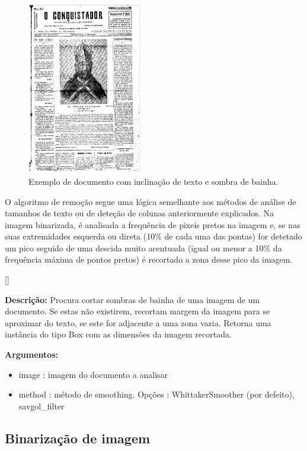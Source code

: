 \begin{figure}[H]
	\centering
	\includegraphics[width=5cm]{images/ilustracoes/document_margin_example.png}
	\caption{Exemplo de documento com inclinação de texto e sombra de bainha.}
	\label{fig:document_margin_example}
\end{figure}



O algoritmo de remoção segue uma lógica semelhante aos métodos de análise de tamanhos de texto ou de deteção de colunas anteriormente explicados. Na imagem binarizada, é analisada a frequência de pixeis pretos na imagem e, se nas suas extremidades esquerda ou direta (10\% de cada uma das pontas) for detetado um pico seguido de uma descida muito acentuada (igual ou menor a 10\% da frequência máxima de pontos pretos) é recortado a zona desse pico da imagem.

[\normalsize]

\textbf{Descrição:} Procura cortar sombras de bainha de uma imagem de um documento. Se estas não existirem, recortam margem da imagem para se aproximar do texto, se este for adjacente a uma zona vazia. Retorna uma instância do tipo Box com as dimensões da imagem recortada.

\textbf{Argumentos:}
\begin{itemize}\setlength\itemsep{-0.3em}
	\item image : imagem do documento a analisar
	\item method : método de smoothing. Opções : WhittakerSmoother (por defeito), savgol\_filter
\end{itemize}


\subsection{Binarização de imagem}
\label{contribution_image_binarization}

